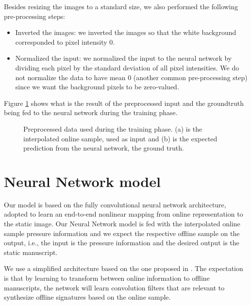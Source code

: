 Besides resizing the images to a standard size, we also performed the following pre-processing steps:
\begin{itemize}
\item Inverted the images: we inverted the images so that the white background corresponded to pixel intensity 0. 
\item Normalized the input: we normalized the input to the
neural network by dividing each pixel by the standard
deviation of all pixel intensities. We do not normalize the data to have mean 0 (another common pre-processing step) since we want the
background pixels to be zero-valued.
 
\end{itemize}

Figure \ref{fig_ironoff} shows what is the result of the preprocessed input and the groundtruth being fed to the neural network during the training phase.



\begin{figure}[!htpb]
\centering
\hspace*{0.5in} %
\caption{Preprocessed data used during the training phase. (a) is the interpolated online sample, used as input and (b) is the expected prediction from the neural network, the ground truth. } \label{fig_ironoff}
\end{figure}



\section{Neural Network model}

Our model is based on the fully convolutional neural network architecture, adopted to learn an end-to-end nonlinear mapping from online representation to the static image. Our Neural Network model is fed with the interpolated online sample pressure information and we expect the respective offline sample on the output, i.e., the input is the pressure information and the desired output is the static manuscript.

We use a simplified architecture based on the one proposed in \cite{long2015fully}. The expectation is that by learning to transform between online information to offline manuscripts, the network will learn convolution filters that are relevant to synthesize offline signatures based on the online sample.

